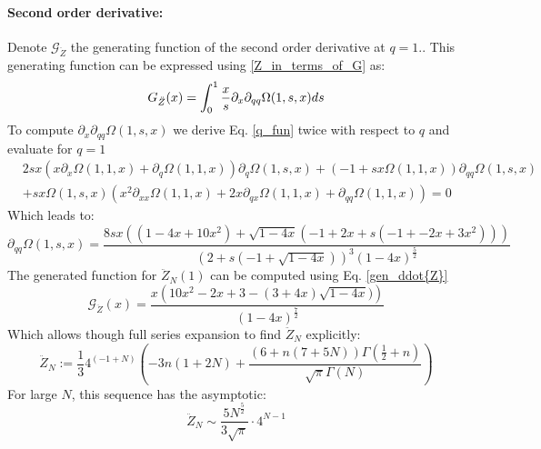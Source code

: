 \documentclass[pdflatex,sn-mathphys-num]{sn-jnl}
\theoremstyle{definition}
\theoremstyle{remark}
\numberwithin{equation}{section}
\begin{document}
\begin{appendices}
\fi

\noindent
\paragraph*{Second order derivative:}
Denote $\mathcal{G}_{\ddot{Z}}$ the generating function of the second order derivative at $q=1$.. This generating function can be expressed using \ref{Z_in_terms_of_G} as:
\begin{equation}\label{gen_ddot{Z}}
G_{\ddot{Z}}(x) =
  \int_{0}^{1} \frac{x}{s} \partial_{x}\partial_{qq} \Omega(1,s,x)
    ds
\end{equation}
To compute $\partial_{x}\partial_{qq} \Omega(1,s,x)$ we derive Eq. \ref{q_fun} twice with respect to $q$ and evaluate for $q=1$
\begin{align*}
&2 s x \left( x \partial_{x} \Omega(1, 1, x)+\partial_{q} \Omega(1, 1, x) \right) \partial_{q} \Omega(1, s, x)
+
\left(-1 + s x \Omega(1, 1, x)\right) \partial_{qq} \Omega(1, s, x) \\
&+
s x \Omega(1, s, x) \left( x^2 \partial_{xx}\Omega(1, 1, x) + 2 x \partial_{q x} \Omega(1, 1, x) + \partial_{qq} \Omega(1, 1, x) \right)
= 0
\end{align*}
Which leads to:
\begin{equation}
\partial_{qq} \Omega(1,s,x) = 
    \frac{8 s x \left(\left(1 - 4 x  + 10 x^2\right) + \sqrt{1 - 4 x} 
    \left(-1 + 2 x + s (-1 + -2x + 3 x^2)\right)
    \right)}{\left(2 + s \left(-1 + \sqrt{1 - 4 x}\right)\right)^3 (1 - 4 x)^{\frac{5}{2}}}
\end{equation}
The generated function for $\ddot{Z}_N(1)$ can be computed using Eq. \ref{gen_ddot{Z}}
\begin{equation}
\mathcal{G}_{\ddot{Z}}(x) =
    \frac{x \left( 10 x^2 - 
    2x+ 3 - (3+4x)\sqrt{1 - 4 x})
    \right)}{(1 - 4 x)^{\frac{7}{2}}}
\end{equation}
Which allows though full series expansion to find $\ddot{Z}_N$ explicitly:
\begin{equation}
\ddot{Z}_N :=
    \frac{1}{3} 4^{(-1 + N)} \left(-3 n (1 + 2 N) + \frac{(6 + n (7 + 5 N)) \Gamma\left(\frac{1}{2} + n\right)}{\sqrt{\pi} \Gamma(N)}\right)
\end{equation}
For large $N$, this sequence has the asymptotic:
\begin{equation}
    \ddot{Z}_N \sim \frac{5 N^{\frac{5}{2}}}{3 \sqrt{\pi}} \cdot 4^{N-1}
\end{equation}






\end{appendices}
\end{document}
